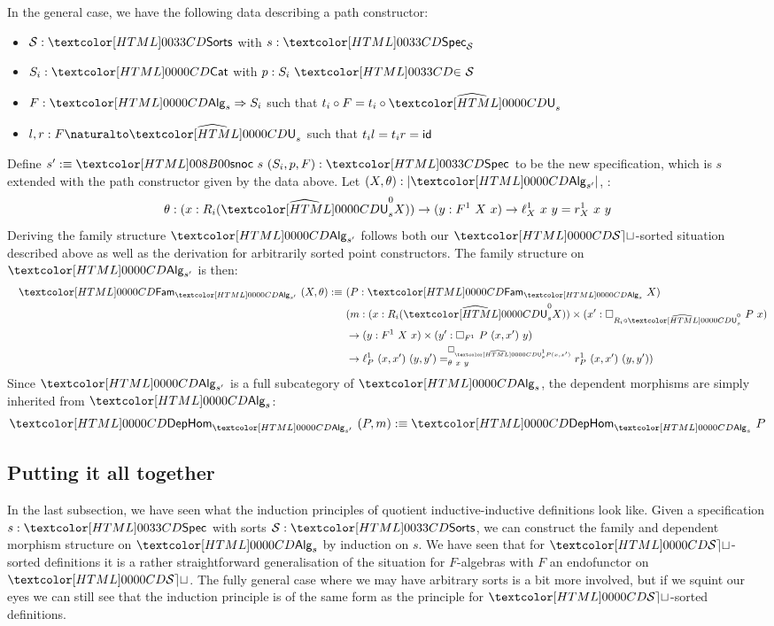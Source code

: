 In the general case, we have the following data describing a path
constructor:
%
\begin{itemize}
\item $\Ss : \sortsty$ with $s : \specty_{\Ss}$
\item $S_i : \Cat$ with $p : \sortsin{S_i}{\Ss}$
\item $F : \Func{\Alg_s}{S_i}$ such that $t_i \circ F = t_i \circ \extendfunc{\Und}_s$
\item $l , r : \Nat{F}{\extendfunc{\Und}_s}$ such that $t_i l = t_i r = \id$
\end{itemize}

Define $s' \ddefeq \specsnoc\ s\ (S_i,p,F) : \specty$ to be the new
specification, which is $s$ extended with the path constructor given
by the data above. Let $(X,\theta) : | \Alg_{s'}|$, \ie:
$$
\theta :  (x : R_i (\extendfunc{\Und}^0_s X)) \to (y : F^1\ X\ x) \to \ell^1_X\ x\ y = r^1_X\ x\ y
$$
Deriving the family structure $\Alg_{s'}$ follows both our
$\SET$-sorted situation described above as well as the derivation for
arbitrarily sorted point constructors. The family structure on
$\Alg_{s'}$ is then:
%
\begin{align*}
&&\Fam_{\Alg_{s'}}\ (X, \theta) \ddefeq&\ (P : \Fam_{\Alg_s}\ X)\\
&&&\ (m : (x : R_i (\extendfunc{\Und}^0_s X)) \times (x' : \Box_{R_i \circ \extendfunc{\Und}^0_s}\ P\ x) \\
&&&\ \to (y : F^1\ X\ x) \times (y' : \Box_{F^1}\ P\ (x, x')\ y) \\
&&&\ \to \pathover{\Box_{\extendfunc{\Und}_s^1 P (x,x')}}{\theta\ x\ y}{\ell^1_P\ (x,x')\ (y,y')}{r^1_P\ (x,x')\ (y,y')})
\end{align*}
%
Since $\Alg_{s'}$ is a full subcategory of $\Alg_s$, the dependent
morphisms are simply inherited from $\Alg_s$:
$$
\DepHom_{\Alg_{s'}}\ (P,m) \ddefeq \DepHom_{\Alg_s}\ P
$$

\subsection{Putting it all together}

In the last subsection, we have seen what the induction principles of
quotient inductive-inductive definitions look like. Given a
specification $s : \specty$ with sorts $\Ss : \sortsty$, we can
construct the family and dependent morphism structure on $\Alg_s$ by
induction on $s$. We have seen that for $\SET$-sorted definitions it
is a rather straightforward generalisation of the situation for
$F$-algebras with $F$ an endofunctor on $\SET$. The fully general case
where we may have arbitrary sorts is a bit more involved, but if we
squint our eyes we can still see that the induction principle is of
the same form as the principle for $\SET$-sorted definitions.

